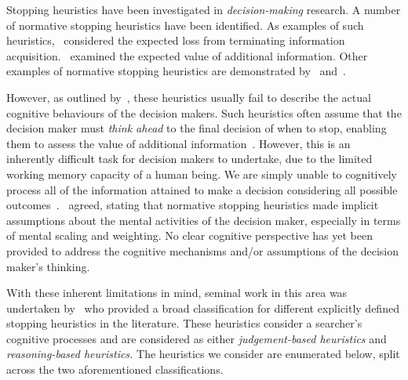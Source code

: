 Stopping heuristics have been investigated in \emph{decision-making} research. A number of normative stopping heuristics have been identified. As examples of such heuristics,~\cite{busemeyer1988deferred_decision_making} considered the expected loss from terminating information acquisition.~\cite{kogut1990sunk_costs} examined the expected value of additional information. Other examples of normative stopping heuristics are demonstrated by~\cite{pitz1969information_seeking} and~\cite{busemeyer1988deferred_decision_making}.

However, as outlined by~\cite{browne2004stopping_rules}, these heuristics usually fail to describe the actual cognitive behaviours of the decision makers. Such heuristics often assume that the decision maker must \emph{think ahead} to the final decision of when to stop, enabling them to assess the value of additional information~\citep{busemeyer1988deferred_decision_making}. However, this is an inherently difficult task for decision makers to undertake, due to the limited working memory capacity of a human being. We are simply unable to cognitively process all of the information attained to make a decision considering all possible outcomes~\citep{browne2004stopping_rules}.~\cite{nickles1995judgment} agreed, stating that normative stopping heuristics made implicit assumptions about the mental activities of the decision maker, especially in terms of mental scaling and weighting. No clear cognitive perspective has yet been provided to address the cognitive mechanisms and/or assumptions of the decision maker's thinking.

With these inherent limitations in mind, seminal work in this area was undertaken by~\cite{nickles1995judgment} who provided a broad classification for different explicitly defined stopping heuristics in the literature. These heuristics consider a searcher's cognitive processes and are considered as either \emph{judgement-based heuristics} and \emph{reasoning-based heuristics.} The heuristics we consider are enumerated below, split across the two aforementioned classifications.


